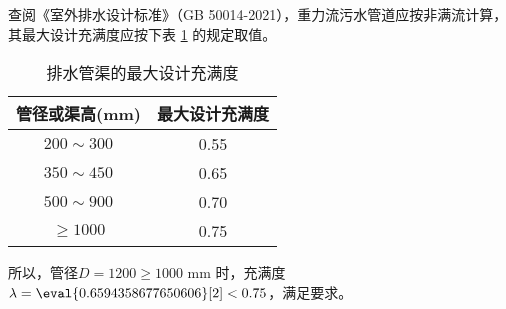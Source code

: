 查阅《室外排水设计标准》（GB 50014-2021），重力流污水管道应按非满流计算，其最大设计充满度应按下表 \ref{tab:Maximum design fullness of drainage channels} 的规定取值。
\begin{table}[H]
	\centering
	\caption{排水管渠的最大设计充满度\cite[p.20]{GB500142021}}
	\begin{tabular}{cc}
		\toprule
		管径或渠高(mm) & 最大设计充满度 \\
		\midrule
		$200\sim300$ & 0.55 \\
		$350\sim450$ & 0.65 \\
		$500\sim900$ & 0.70 \\
		$\geqslant 1000$  & 0.75 \\
		\bottomrule
	\end{tabular}%
	\label{tab:Maximum design fullness of drainage channels}%
\end{table}%

所以，管径$D = 1200 \geqslant 1000$ mm 时，充满度$\lambda = \eval{0.6594358677650606}[2]<0.75$，满足要求。


